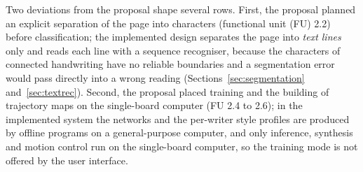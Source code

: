 Two deviations from the proposal shape several rows.
First, the proposal planned an explicit separation of the page into characters (functional unit (FU) 2.2) before classification; the implemented design separates the page into \emph{text lines} only and reads each line with a sequence recogniser, because the characters of connected handwriting have no reliable boundaries and a segmentation error would pass directly into a wrong reading (Sections~\ref{sec:segmentation} and~\ref{sec:textrec}).
Second, the proposal placed training and the building of trajectory maps on the single-board computer (FU 2.4 to 2.6); in the implemented system the networks and the per-writer style profiles are produced by offline programs on a general-purpose computer, and only inference, synthesis and motion control run on the single-board computer, so the training mode is not offered by the user interface.

